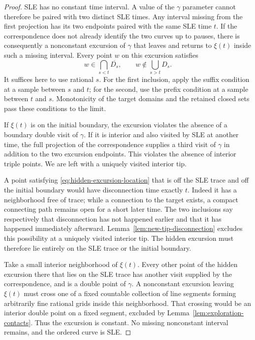 \begin{proof}
SLE has no constant time interval.  A value of the $\gamma$
parameter cannot therefore be paired with two distinct SLE
times.  Any interval missing from the first projection has its
two endpoints paired with the same SLE time $t$.  If the
correspondence does not already identify the two curves up to
pauses, there is consequently a nonconstant excursion of
$\gamma$ that leaves and returns to $\xi(t)$ inside such a
missing interval.  Every point $w$ on this excursion satisfies
\begin{equation}
\label{eq:hidden-excursion-location}
 w\in\bigcap_{s<t}\overline{D_s},
 \qquad
 w\notin\bigcup_{s>t}D_s.
\end{equation}
It suffices here to use rational $s$.  For the first inclusion,
apply the suffix condition at a sample between $s$ and $t$;
for the second, use the prefix condition at a sample between
$t$ and $s$.  Monotonicity of the target domains and the retained
closed sets pass these conditions to the limit.

If $\xi(t)$ is on the initial boundary, the excursion violates
the absence of a boundary double visit of $\gamma$.  If it is
interior and also visited by SLE at another time, the full
projection of the correspondence supplies a third visit of
$\gamma$ in addition to the two excursion endpoints.  This
violates the absence of interior triple points.  We are left
with a uniquely visited interior tip.

A point satisfying \eqref{eq:hidden-excursion-location} that is
off the SLE trace and off the initial boundary would have
disconnection time exactly $t$.  Indeed it has a neighborhood
free of trace; while a connection to the target exists, a compact
connecting path remains open for a short later time.  The two
inclusions say respectively that disconnection has not happened
earlier and that it has happened immediately afterward.
Lemma~\ref{lem:new-tip-disconnection} excludes this possibility
at a uniquely visited interior tip.  The hidden excursion must
therefore lie entirely on the SLE trace or the initial boundary.

Take a small interior neighborhood of $\xi(t)$.  Every other
point of the hidden excursion there that lies on the SLE trace
has another visit supplied by the correspondence, and is a
double point of $\gamma$.  A nonconstant excursion leaving
$\xi(t)$ must cross one of a fixed countable collection of
line segments forming arbitrarily fine rational grids inside
this neighborhood.  That crossing would be an interior double
point on a fixed segment, excluded by
Lemma~\ref{lem:exploration-contacts}.  Thus the excursion is
constant.  No missing nonconstant interval remains, and the
ordered curve is SLE.
\end{proof}

